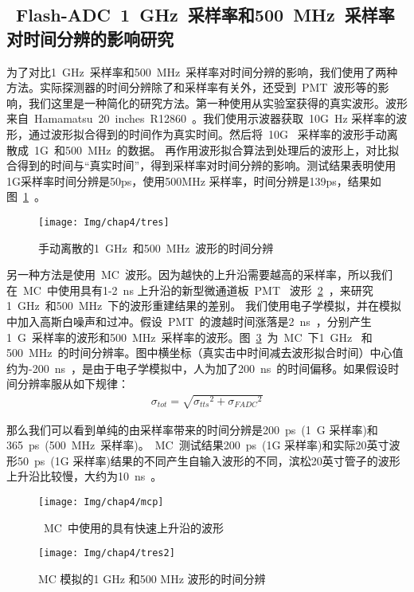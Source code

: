 \subsection{~Flash-ADC~1~GHz~采样率和500~MHz~采样率对时间分辨的影响研究}
为了对比1~GHz~采样率和500~MHz~采样率对时间分辨的影响，我们使用了两种方法。实际探测器的时间分辨除了和采样率有关外，还受到~PMT~波形等的影响，我们这里是一种简化的研究方法。第一种使用从实验室获得的真实波形。波形来自~Hamamatsu~20~inches~R12860~。我们使用示波器获取~10G~Hz 采样率的波形，通过波形拟合得到的时间作为真实时间。然后将~10G~ 采样率的波形手动离散成~1G~和500~MHz~的数据。 再作用波形拟合算法到处理后的波形上，对比拟合得到的时间与``真实时间''，得到采样率对时间分辨的影响。测试结果表明使用1G采样率时间分辨是50ps，使用500MHz 采样率，时间分辨是139ps，结果如图~\ref{fig:tres}~。
  \begin{figure}[!htbp]
  \centering
   \texttt{[image: Img/chap4/tres]}
    \caption{手动离散的1~GHz~和500~MHz~波形的时间分辨 }
  \label{fig:tres}
\end{figure}

另一种方法是使用~MC~波形。因为越快的上升沿需要越高的采样率，所以我们在~MC~中使用具有1-2~ns 上升沿的新型微通道板~PMT~ 波形~\ref{fig:mcp}~，来研究1~GHz~和500~MHz~下的波形重建结果的差别。 我们使用电子学模拟，并在模拟中加入高斯白噪声和过冲。假设~PMT~的渡越时间涨落是2~ns~，分别产生1~G~采样率的波形和500~MHz~采样率的波形。图~\ref{fig:tres2}~为~MC~下1~GHz~ 和500~MHz~的时间分辨率。图中横坐标（真实击中时间减去波形拟合时间）中心值约为-200~ns~，是由于电子学模拟中，人为加了200~ns~的时间偏移。如果假设时间分辨率服从如下规律：
\begin{eqnarray}
\sigma_{tot}=\sqrt{{\sigma_{tts}}^2+{\sigma_{FADC}}^2}
\end{eqnarray}

那么我们可以看到单纯的由采样率带来的时间分辨是200~ps~(1~G 采样率)和365~ps~(500~MHz~采样率)。~MC~测试结果200~ps~(1G 采样率)和实际20英寸波形50~ps~(1G 采样率)结果的不同产生自输入波形的不同，滨松20英寸管子的波形上升沿比较慢，大约为10~ns~。
  \begin{figure}[!htbp]
  \centering
   \texttt{[image: Img/chap4/mcp]}
    \caption{~MC~中使用的具有快速上升沿的波形}
  \label{fig:mcp}
\end{figure}
  \begin{figure}[!htbp]
  \centering
   \texttt{[image: Img/chap4/tres2]}
    \caption{ MC 模拟的1 GHz 和500 MHz 波形的时间分辨 }
  \label{fig:tres2}
\end{figure}
